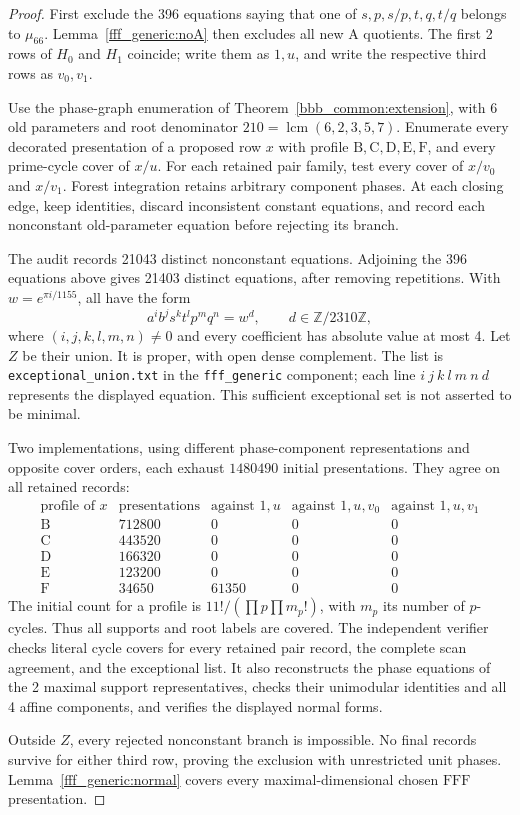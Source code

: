 \documentclass[11pt,a4paper]{article}
\theoremstyle{plain}
\theoremstyle{definition}
\theoremstyle{plain}
\begin{document}
\begin{proof}
First exclude the 396 equations saying that one of $s,p,s/p,t,q,t/q$ belongs to $\mu_{66}$. Lemma~\ref{fff_generic:noA} then excludes all new $\mathrm{A}$ quotients. The first 2 rows of $H_0$ and $H_1$ coincide; write them as $1,u$, and write the respective third rows as $v_0,v_1$.

Use the phase-graph enumeration of Theorem~\ref{bbb_common:extension}, with 6 old parameters and root denominator $210=\operatorname{lcm}(6,2,3,5,7)$. Enumerate every decorated presentation of a proposed row $x$ with profile $\mathrm{B},\mathrm{C},\mathrm{D},\mathrm{E},\mathrm{F}$, and every prime-cycle cover of $x/u$. For each retained pair family, test every cover of $x/v_0$ and $x/v_1$. Forest integration retains arbitrary component phases. At each closing edge, keep identities, discard inconsistent constant equations, and record each nonconstant old-parameter equation before rejecting its branch.

The audit records 21043 distinct nonconstant equations. Adjoining the 396 equations above gives 21403 distinct equations, after removing repetitions. With $w=e^{\pi i/1155}$, all have the form
$$a^i b^j s^k t^l p^m q^n=w^d,\qquad d\in\mathbb Z/2310\mathbb Z,$$
where $(i,j,k,l,m,n)\ne0$ and every coefficient has absolute value at most 4. Let $Z$ be their union. It is proper, with open dense complement. The list is \texttt{exceptional\_union.txt} in the \texttt{fff\_generic} component; each line $i\ j\ k\ l\ m\ n\ d$ represents the displayed equation. This sufficient exceptional set is not asserted to be minimal.

Two implementations, using different phase-component representations and opposite cover orders, each exhaust $1480490$ initial presentations. They agree on all retained records:
$$\begin{array}{c|r|r|r|r}
\text{profile of }x&\text{presentations}&\text{against }1,u&\text{against }1,u,v_0&\text{against }1,u,v_1\\\hline
\mathrm{B}&712800&0&0&0\\
\mathrm{C}&443520&0&0&0\\
\mathrm{D}&166320&0&0&0\\
\mathrm{E}&123200&0&0&0\\
\mathrm{F}&34650&61350&0&0
\end{array}$$
The initial count for a profile is $11!/(\prod p\prod m_p!)$, with $m_p$ its number of $p$-cycles. Thus all supports and root labels are covered. The independent verifier checks literal cycle covers for every retained pair record, the complete scan agreement, and the exceptional list. It also reconstructs the phase equations of the 2 maximal support representatives, checks their unimodular identities and all 4 affine components, and verifies the displayed normal forms.

Outside $Z$, every rejected nonconstant branch is impossible. No final records survive for either third row, proving the exclusion with unrestricted unit phases. Lemma~\ref{fff_generic:normal} covers every maximal-dimensional chosen $\mathrm{FFF}$ presentation.
\end{proof}
\end{document}

